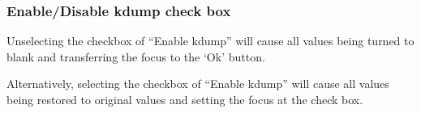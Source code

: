 \documentclass{article}
\begin{document}
\subsubsection{Enable/Disable kdump check box}
\noindent
Unselecting the checkbox of ``Enable kdump'' will cause all values being turned to
blank and transferring the focus to the `Ok' button. 
\begin{figure}[H]        
\end{figure}
\noindent
Alternatively, selecting the checkbox of ``Enable kdump'' will cause all values
being restored to original values and setting the focus at the check box.
\end{document}
